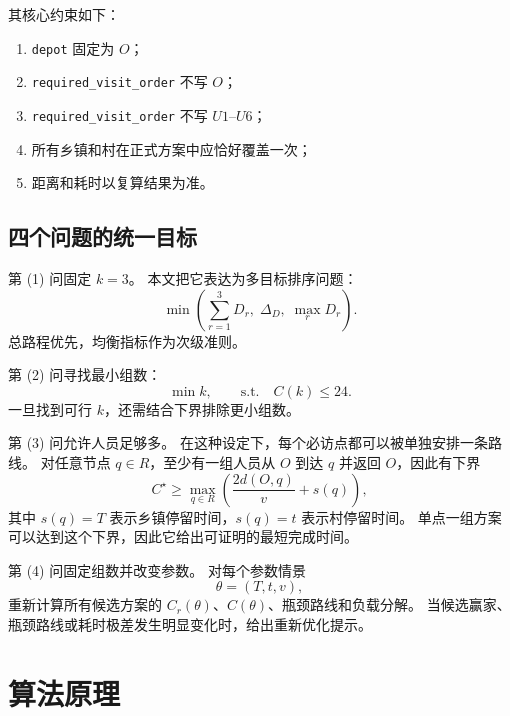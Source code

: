 \documentclass[a4paper, 12pt]{article}
\begin{document}
其核心约束如下：
\begin{enumerate}[leftmargin=2em]
    \item \texttt{depot} 固定为 $O$；
    \item \texttt{required\_visit\_order} 不写 $O$；
    \item \texttt{required\_visit\_order} 不写 $U1$--$U6$；
    \item 所有乡镇和村在正式方案中应恰好覆盖一次；
    \item 距离和耗时以复算结果为准。
\end{enumerate}

\subsection{四个问题的统一目标}

第 (1) 问固定 $k=3$。
本文把它表达为多目标排序问题：
\begin{equation}
    \min \left(
    \sum_{r=1}^{3} D_r,\;
    \Delta_D,\;
    \max_r D_r
    \right).
    \label{eq:problem-one}
\end{equation}
总路程优先，均衡指标作为次级准则。

第 (2) 问寻找最小组数：
\begin{equation}
    \min k,\qquad \text{s.t.}\quad C(k)\le 24.
    \label{eq:problem-two}
\end{equation}
一旦找到可行 $k$，还需结合下界排除更小组数。

第 (3) 问允许人员足够多。
在这种设定下，每个必访点都可以被单独安排一条路线。
对任意节点 $q\in R$，至少有一组人员从 $O$ 到达 $q$ 并返回 $O$，因此有下界
\begin{equation}
    C^\star \ge
    \max_{q\in R}
    \left(
        \frac{2d(O,q)}{v}+s(q)
    \right),
    \label{eq:single-node-lower-bound}
\end{equation}
其中 $s(q)=T$ 表示乡镇停留时间，$s(q)=t$ 表示村停留时间。
单点一组方案可以达到这个下界，因此它给出可证明的最短完成时间。

第 (4) 问固定组数并改变参数。
对每个参数情景
\begin{equation}
    \theta=(T,t,v),
\end{equation}
重新计算所有候选方案的 $C_r(\theta)$、$C(\theta)$、瓶颈路线和负载分解。
当候选赢家、瓶颈路线或耗时极差发生明显变化时，给出重新优化提示。

\section{算法原理}
\end{document}
